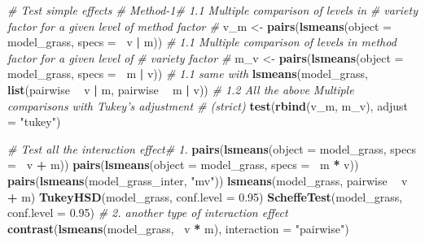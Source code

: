 \documentclass[]{article}
\newenvironment{Shaded}{\begin{snugshade}}{\end{snugshade}}
\newcommand{\CommentTok}[1]{\textcolor[rgb]{0.56,0.35,0.01}{\textit{#1}}}
\newcommand{\DataTypeTok}[1]{\textcolor[rgb]{0.13,0.29,0.53}{#1}}
\newcommand{\FloatTok}[1]{\textcolor[rgb]{0.00,0.00,0.81}{#1}}
\newcommand{\KeywordTok}[1]{\textcolor[rgb]{0.13,0.29,0.53}{\textbf{#1}}}
\newcommand{\NormalTok}[1]{#1}
\newcommand{\OperatorTok}[1]{\textcolor[rgb]{0.81,0.36,0.00}{\textbf{#1}}}
\newcommand{\StringTok}[1]{\textcolor[rgb]{0.31,0.60,0.02}{#1}}
\begin{document}
\begin{Shaded}
\begin{Highlighting}[]
\CommentTok{# Test simple effects # Method-1# 1.1 Multiple comparison of levels in}
\CommentTok{# variety factor for a given level of method factor #}
\NormalTok{v_m <-}\StringTok{ }\KeywordTok{pairs}\NormalTok{(}\KeywordTok{lsmeans}\NormalTok{(}\DataTypeTok{object =}\NormalTok{ model_grass, }\DataTypeTok{specs =} \OperatorTok{~}\NormalTok{v }\OperatorTok{|}\StringTok{ }\NormalTok{m))}
\CommentTok{# 1.1 Multiple comparison of levels in method factor for a given level of}
\CommentTok{# variety factor #}
\NormalTok{m_v <-}\StringTok{ }\KeywordTok{pairs}\NormalTok{(}\KeywordTok{lsmeans}\NormalTok{(}\DataTypeTok{object =}\NormalTok{ model_grass, }\DataTypeTok{specs =} \OperatorTok{~}\NormalTok{m }\OperatorTok{|}\StringTok{ }\NormalTok{v))}
\CommentTok{# 1.1 same with}
\KeywordTok{lsmeans}\NormalTok{(model_grass, }\KeywordTok{list}\NormalTok{(pairwise }\OperatorTok{~}\StringTok{ }\NormalTok{v }\OperatorTok{|}\StringTok{ }\NormalTok{m, pairwise }\OperatorTok{~}\StringTok{ }\NormalTok{m }\OperatorTok{|}\StringTok{ }\NormalTok{v))}
\CommentTok{# 1.2 All the above Multiple comparisons with Tukey's adjustment # (strict)}
\KeywordTok{test}\NormalTok{(}\KeywordTok{rbind}\NormalTok{(v_m, m_v), }\DataTypeTok{adjust =} \StringTok{"tukey"}\NormalTok{)}

\CommentTok{# Test all the interaction effect# 1.}
\KeywordTok{pairs}\NormalTok{(}\KeywordTok{lsmeans}\NormalTok{(}\DataTypeTok{object =}\NormalTok{ model_grass, }\DataTypeTok{specs =} \OperatorTok{~}\NormalTok{v }\OperatorTok{+}\StringTok{ }\NormalTok{m))}
\KeywordTok{pairs}\NormalTok{(}\KeywordTok{lsmeans}\NormalTok{(}\DataTypeTok{object =}\NormalTok{ model_grass, }\DataTypeTok{specs =} \OperatorTok{~}\NormalTok{m }\OperatorTok{*}\StringTok{ }\NormalTok{v))}
\KeywordTok{pairs}\NormalTok{(}\KeywordTok{lsmeans}\NormalTok{(model_grass_inter, }\StringTok{"mv"}\NormalTok{))}
\KeywordTok{lsmeans}\NormalTok{(model_grass, pairwise }\OperatorTok{~}\StringTok{ }\NormalTok{v }\OperatorTok{+}\StringTok{ }\NormalTok{m)}
\KeywordTok{TukeyHSD}\NormalTok{(model_grass, }\DataTypeTok{conf.level =} \FloatTok{0.95}\NormalTok{)}
\KeywordTok{ScheffeTest}\NormalTok{(model_grass, }\DataTypeTok{conf.level =} \FloatTok{0.95}\NormalTok{)}
\CommentTok{# 2. another type of interaction effect}
\KeywordTok{contrast}\NormalTok{(}\KeywordTok{lsmeans}\NormalTok{(model_grass, }\OperatorTok{~}\NormalTok{v }\OperatorTok{*}\StringTok{ }\NormalTok{m), }\DataTypeTok{interaction =} \StringTok{"pairwise"}\NormalTok{)}


\end{Highlighting}
\end{Shaded}
\end{document}
